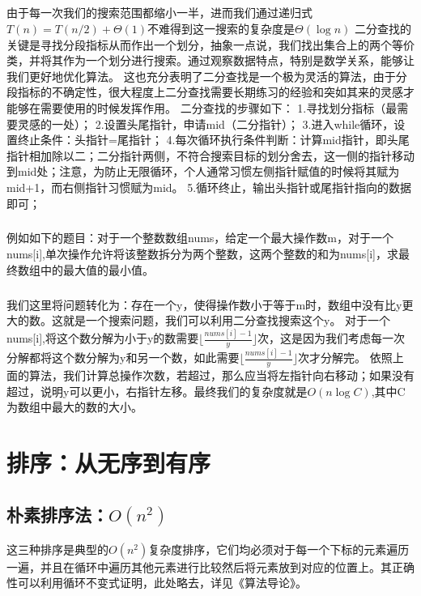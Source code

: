 \documentclass[12pt,a4paper,UTF16]{ctexbook}
\theoremstyle{plain}
\begin{document}
\paragraph{}
由于每一次我们的搜索范围都缩小一半，进而我们通过递归式$T(n)=T(n/2)+\Theta(1)$不难得到这一搜索的复杂度是$\Theta(\log n)$
二分查找的关键是寻找分段指标从而作出一个划分，抽象一点说，我们找出集合上的两个等价类，并将其作为一个划分进行搜索。通过观察数据特点，特别是数学关系，能够让我们更好地优化算法。
这也充分表明了二分查找是一个极为灵活的算法，由于分段指标的不确定性，很大程度上二分查找需要长期练习的经验和突如其来的灵感才能够在需要使用的时候发挥作用。
二分查找的步骤如下：
1.寻找划分指标（最需要灵感的一处）；
2.设置头尾指针，申请mid（二分指针）；
3.进入while循环，设置终止条件：头指针=尾指针；
4.每次循环执行条件判断：计算mid指针，即头尾指针相加除以二；二分指针两侧，不符合搜索目标的划分舍去，这一侧的指针移动到mid处；注意，为防止无限循环，个人通常习惯左侧指针赋值的时候将其赋为mid+1，而右侧指针习惯赋为mid。
5.循环终止，输出头指针或尾指针指向的数据即可；
\paragraph{}
例如如下的题目：对于一个整数数组nums，给定一个最大操作数m，对于一个nums[i],单次操作允许将该整数拆分为两个整数，这两个整数的和为nums[i]，求最终数组中的最大值的最小值。
\paragraph{}
我们这里将问题转化为：存在一个y，使得操作数小于等于m时，数组中没有比y更大的数。这就是一个搜索问题，我们可以利用二分查找搜索这个y。
对于一个nums[i],将这个数分解为小于y的数需要$\lfloor{\frac{nums[i]-1}{y}}\rfloor$次，这是因为我们考虑每一次分解都将这个数分解为y和另一个数，如此需要$\lfloor{\frac{nums[i]-1}{y}}\rfloor$次才分解完。
依照上面的算法，我们计算总操作次数，若超过，那么应当将左指针向右移动；如果没有超过，说明y可以更小，右指针左移。最终我们的复杂度就是$O(n \log C)$,其中C为数组中最大的数的大小。

\chapter{排序：从无序到有序}
\section{朴素排序法：$O(n^2)$}
这三种排序是典型的$O(n^2)$复杂度排序，它们均必须对于每一个下标的元素遍历一遍，并且在循环中遍历其他元素进行比较然后将元素放到对应的位置上。其正确性可以利用循环不变式证明，此处略去，详见《算法导论》。
\end{document}
